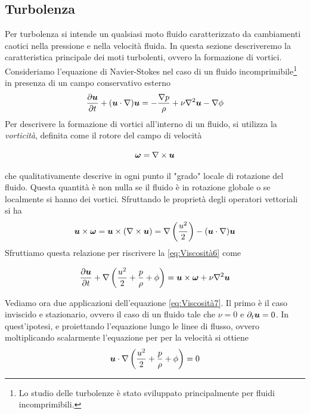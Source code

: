 \subsection{Turbolenza}
Per turbolenza si intende un qualsiasi moto fluido caratterizzato da cambiamenti caotici nella pressione e nella velocità fluida. In questa sezione descriveremo la caratteristica principale dei moti turbolenti, ovvero la formazione di vortici. Consideriamo l'equazione di Navier-Stokes nel caso di un fluido incomprimibile\footnote{Lo studio delle turbolenze è stato sviluppato principalmente per fluidi incomprimibili.} in presenza di un campo conservativo esterno
\begin{equation}
\derP{\V{u}}{t} + (\scal{u}{\nabla})\V{u} =  -\dfrac{\Grad p}{\rho} + \nu\nabla^2 \V{u} 
 -\Grad \phi \label{eq:Viscosità6}
\end{equation}
Per descrivere la formazione di vortici all'interno di un fluido, si utilizza la \textit{vorticità}, definita come il rotore del campo di velocità
\begin{EQ}
\begin{equation}
\V{\omega}=\Rot{u}
\end{equation}
\end{EQ}
che qualitativamente descrive in ogni punto il "grado" locale di rotazione del fluido. Questa quantità è non nulla se il fluido è in rotazione globale o se localmente si hanno dei vortici. Sfruttando le proprietà degli operatori vettoriali si ha
\begin{equation}
\vett{u}{\omega} = \vett{u}{}(\Rot{u}) = \Grad \tonde{\dfrac{u^2}{2}} - (\scal{u}{\nabla})\V{u} \label{eq:Viscosità11}
\end{equation}
Sfruttiamo questa relazione per riscrivere la \ref{eq:Viscosità6} come
\begin{EQ}
\begin{equation}
\derP{\V{u}}{t} + \Grad \tonde{\dfrac{u^2}{2} + \dfrac{p}{\rho} + \phi} = \vett{u}{\omega} +\nu \Grad^2 \V{u} \label{eq:Viscosità7}
\end{equation}
\end{EQ}
Vediamo ora due applicazioni dell'equazione \ref{eq:Viscosità7}. Il primo è il caso inviscido e stazionario, ovvero il caso di un fluido tale che $\nu=0$ e $\dpt \V{u}=0$. In quest'ipotesi, e proiettando l'equazione lungo le linee di flusso, ovvero moltiplicando scalarmente l'equazione per per la velocità si ottiene
\begin{equation}
\scal{u}{\nabla}\tonde{\dfrac{u^2}{2} + \dfrac{p}{\rho} + \phi} =  0
\end{equation} 
